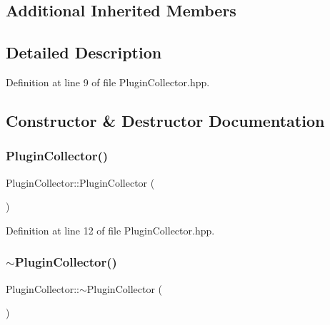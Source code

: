 \subsection*{Additional Inherited Members}


\subsection{Detailed Description}


Definition at line 9 of file Plugin\+Collector.\+hpp.



\subsection{Constructor \& Destructor Documentation}
\mbox{\label{class_plugin_collector_a53aeef5e9d4d5c31903532f879b205d1}} 
\subsubsection{\texorpdfstring{PluginCollector()}{PluginCollector()}}
{\footnotesize\ttfamily Plugin\+Collector\+::\+Plugin\+Collector (\begin{DoxyParamCaption}{ }\end{DoxyParamCaption})\hspace{0.3cm}{\ttfamily [inline]}}



Definition at line 12 of file Plugin\+Collector.\+hpp.

\mbox{\label{class_plugin_collector_a3f4b864ec982e40a674a6e6719fe203b}} 
\subsubsection{\texorpdfstring{$\sim$PluginCollector()}{~PluginCollector()}}
{\footnotesize\ttfamily Plugin\+Collector\+::$\sim$\+Plugin\+Collector (\begin{DoxyParamCaption}{ }\end{DoxyParamCaption})\hspace{0.3cm}{\ttfamily [default]}}




